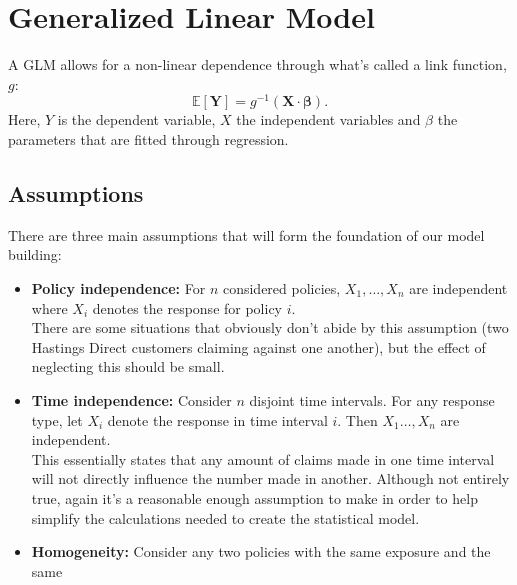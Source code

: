 \documentclass{article}
\begin{document}
\section{Generalized Linear Model}
A GLM allows for a non-linear dependence through what's called a link function, $g$:
\begin{equation}
    \mathbb{E}[\mathbf{Y}] = g^{-1}(\mathbf{X}\cdot\mathbf{\beta}).
\end{equation}
Here, $Y$ is the dependent variable, $X$ the independent variables and $\beta$ the parameters that are fitted through regression. 
\subsection{Assumptions}
There are three main assumptions that will form the foundation of our model building:
\begin{itemize}
    \item \textbf{Policy independence:} For $n$ considered policies, $X_1,\ldots,X_n$ are independent where $X_i$ denotes the response for policy $i$.\\
    There are some situations that obviously don't abide by this assumption (two Hastings Direct customers claiming against one another), but the effect of neglecting this should be small.
    \item \textbf{Time independence:} Consider $n$ disjoint time intervals. For any response type, let $X_i$ denote the response in time interval $i$. Then $X_1\ldots,X_n$ are independent.\\
    This essentially states that any amount of claims made in one time interval will not directly influence the number made in another. Although not entirely true, again it's a reasonable enough assumption to make in order to help simplify the calculations needed to create the statistical model.
    \item \textbf{Homogeneity:} Consider any two policies with the same exposure and the same 
\end{itemize}
\end{document}
